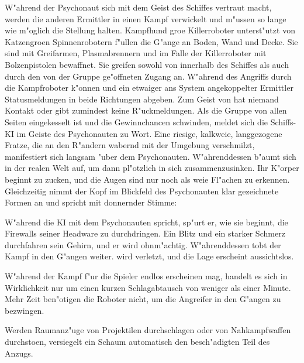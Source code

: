 W"ahrend der Psychonaut sich mit dem Geist des Schiffes vertraut macht, werden die anderen Ermittler in einen Kampf verwickelt und m"ussen so lange wie m"oglich die Stellung halten. Kampfhund gro\3e Killerroboter unterst"utzt von Katzengro\3en Spinnenrobotern f"ullen die G"ange an Boden, Wand und Decke. Sie sind mit Greifarmen, Plasmabrennern und im Falle der Killerroboter mit Bolzenpistolen bewaffnet. Sie greifen sowohl von innerhalb des Schiffes als auch durch den von der Gruppe ge"offneten Zugang an. W"ahrend des Angriffs durch die Kampfroboter k"onnen \ml{} und ein etwaiger ans System angekoppelter Ermittler Statusmeldungen in beide Richtungen abgeben. Zum Geist von \xl{} hat niemand Kontakt oder \ml{} gibt zumindest keine R"uckmeldungen. Als die Gruppe von allen Seiten eingekesselt ist und die Gewinnchancen schwinden, meldet sich die Schiffs-KI im Geiste des Psychonauten zu Wort. Eine riesige, kalkwei\3e, langgezogene Fratze, die an den R"andern wabernd mit der Umgebung verschmilzt, manifestiert sich langsam "uber dem Psychonauten. W"ahrenddessen b"aumt sich \xl{} in der realen Welt auf, um dann pl"otzlich in sich zusammenzusinken. Ihr K"orper beginnt zu zucken, und die Augen sind nur noch als wei\3e Fl"achen zu erkennen. Gleichzeitig nimmt der Kopf im Blickfeld des Psychonauten klar gezeichnete Formen an und spricht mit donnernder Stimme:


W"ahrend die KI mit dem Psychonauten spricht, sp"urt er, wie sie beginnt, die Firewalls seiner Headware zu durchdringen. Ein Blitz und ein starker Schmerz durchfahren sein Gehirn, und er wird ohnm"achtig. W"ahrenddessen tobt der Kampf in den G"angen weiter. \ml{} wird verletzt, und die Lage erscheint aussichtslos.

\begin{remarks}
    W"ahrend der Kampf f"ur die Spieler endlos erscheinen mag, handelt es sich in Wirklichkeit nur um einen kurzen Schlagabtausch von weniger als einer Minute. Mehr Zeit ben"otigen die Roboter nicht, um die Angreifer in den G"angen zu bezwingen.

    Werden Raumanz"uge von Projektilen durchschlagen oder von Nahkampfwaffen durchsto\3en, versiegelt ein Schaum automatisch den besch"adigten Teil des Anzugs.
\end{remarks}    
